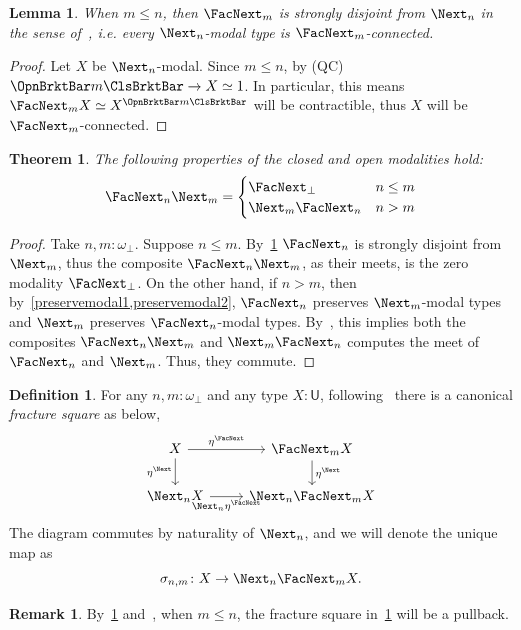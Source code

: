 \documentclass[a4paper,10pt]{amsart}
\newtheorem{theorem}{Theorem}[section]
\newtheorem{lemma}{Lemma}[section]
\theoremstyle{definition}
\newtheorem{definition}{Definition}[section]
\newtheorem{remark}{Remark}[section]
\newcommand{\ms}[1]{\mathsf{#1}}
\newcommand{\ass}[1]{\OpnBrktBar#1\ClsBrktBar}
\newcommand{\ovob}{\omega_\bot}
\newcommand{\Type}{\ms U}
\newcommand{\opm}[1]{\FacNext_{#1}}
\newcommand{\clm}[1]{\Next_{#1}}
\newcommand{\opmm}{\FacNext}
\newcommand{\clmm}{\Next}
\begin{document}
\begin{lemma}\label{stronglydisjoint}
  When $m \le n$, then $\opm m$ is strongly disjoint from $\clm n$ in the sense of~\cite{lmcs:3826}, i.e. every $\clm n$-modal type is $\opm m$-connected.
\end{lemma}
\begin{proof}
  Let $X$ be $\clm n$-modal. Since $m \le n$, by (QC) $\ass m \to X\simeq 1$. In particular, this means $\opm mX \simeq X^{\ass m}$ will be contractible, thus $X$ will be $\opm m$-connected.
\end{proof}

\begin{theorem}\label{modalitycommute}
  The following properties of the closed and open modalities hold:
  \[
  \opm n\clm m =
  \begin{cases}
    \opm{\bot} & n \le m \\
    \clm m\opm n & n > m
  \end{cases}
  \]
\end{theorem}
\begin{proof}
  Take $n,m:\ovob$. Suppose $n \le m$. By~\cref{stronglydisjoint} $\opm n$ is strongly disjoint from $\clm m$, thus the composite $\opm n\clm m$, as their meets, is the zero modality $\opm{\bot}$. On the other hand, if $n > m$, then by~\cref{preservemodal1,preservemodal2}, $\opm n$ preserves $\clm m$-modal types and $\clm m$ preserves $\opm n$-modal types. By~\cite{lmcs:3826}, this implies both the composites $\opm n\clm m$ and $\clm m\opm n$ computes the meet of $\opm n$ and $\clm m$. Thus, they commute.
\end{proof}

\begin{definition}\label{fracture}
  For any $n,m:\ovob$ and any type $X:\Type$, following~\cite{lmcs:3826} there is a canonical \emph{fracture square} as below,
  \[
  \begin{tikzcd}
    X \ar[d, "\eta^{\clmm}"'] \ar[r, "\eta^{\opmm}"] & \opm m X \ar[d, "\eta^{\clmm}"] \\
    \clm n X \ar[r, "\clm n\eta^{\opmm}"'] & \clm n\opm m X
  \end{tikzcd}
  \]
  The diagram commutes by naturality of $\clm n$, and we will denote the unique map as 
  \[ \sigma_{n,m} \colon X \to \clm n\opm mX. \]
\end{definition}

\begin{remark}
  By~\cref{stronglydisjoint} and~\cite{lmcs:3826}, when $m \le n$, the fracture square in~\cref{fracture} will be a pullback.
\end{remark}
\end{document}
